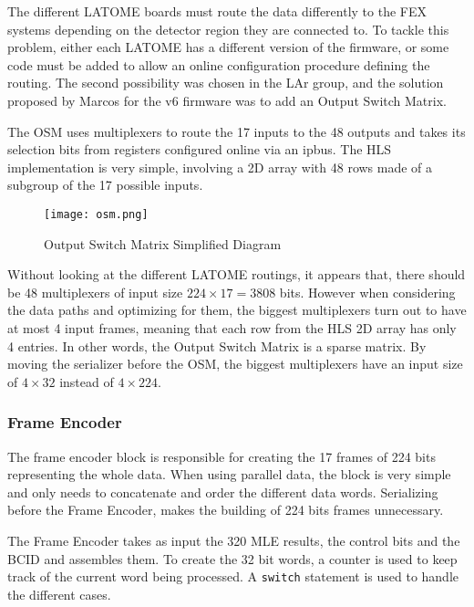 The different LATOME boards must route the data differently to the FEX systems depending on the detector region they are connected to. To tackle this problem, either each LATOME has a different version of the firmware, or some code must be added to allow an online configuration procedure defining the routing. The second possibility was chosen in the LAr group, and the solution proposed by Marcos for the v6 firmware was to add an Output Switch Matrix. 

The OSM uses multiplexers to route the 17 inputs to the 48 outputs and takes its selection bits from registers configured online via an ipbus. The HLS implementation is very simple, involving a 2D array with 48 rows made of a subgroup of the 17 possible inputs.

\begin{figure}
    \centering
    \texttt{[image: osm.png]}
    \caption{Output Switch Matrix Simplified Diagram}
    \label{fig:original-vhdl-design}
\end{figure}

Without looking at the different LATOME routings, it appears that, there should be 48 multiplexers of input size \(224\times17=3808\) bits. However when considering the data paths and optimizing for them, the biggest multiplexers turn out to have at most 4 input frames, meaning that each row from the HLS 2D array has only 4 entries. In other words, the Output Switch Matrix is a sparse matrix. By moving the serializer before the OSM, the biggest multiplexers have an input size of \(4\times32\) instead of \(4\times224\).

\subsubsection{Frame Encoder}

The frame encoder block is responsible for creating the 17 frames of 224 bits representing the whole data. When using parallel data, the block is very simple and only needs to concatenate and order the different data words. Serializing before the Frame Encoder, makes the building of 224 bits frames unnecessary.

The Frame Encoder takes as input the 320 MLE results, the control bits and the BCID and assembles them. To create the 32 bit words, a counter is used to keep track of the current word being processed. A \verb|switch| statement is used to handle the different cases.


